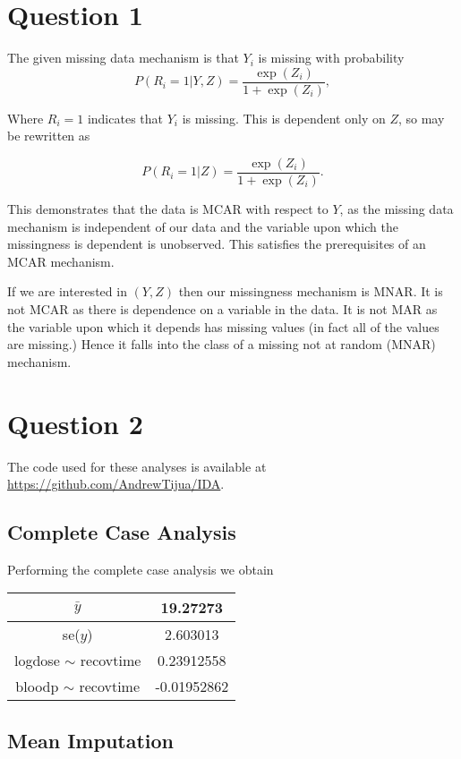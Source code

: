 \documentclass[11pt]{article}
\begin{document}
	
\section{Question 1}

The given missing data mechanism is that $Y_i$ is missing with probability $$P(R_i = 1|Y,Z) = \frac{\exp(Z_i)}{1+\exp(Z_i)},$$

Where $R_i = 1$ indicates that $Y_i$ is missing. This is dependent only on $Z$, so may be rewritten as 

$$P(R_i = 1|Z) = \frac{\exp(Z_i)}{1+\exp(Z_i)}.$$

This demonstrates that the data is MCAR with respect to $Y$, as the missing data mechanism is independent of our data and the variable upon which the missingness is dependent is unobserved. This satisfies the prerequisites of an MCAR mechanism.

If we are interested in $(Y,Z)$ then our missingness mechanism is MNAR. It is not MCAR as there is dependence on a variable in the data. It is not MAR as the variable upon which it depends has missing values (in fact all of the values are missing.) Hence it falls into the class of a missing not at random (MNAR) mechanism.

\section{Question 2}

The code used for these analyses is available at \url{https://github.com/AndrewTijua/IDA}.

\subsection*{Complete Case Analysis}

Performing the complete case analysis we obtain 

\begin{table}[H]
\centering
\begin{tabular}{|c|c|}
	\hline 
	$\bar{y}$ & 19.27273\\ 
	\hline 
	se($y$) & 2.603013\\ 
	\hline 
	logdose $\sim$ recovtime & 0.23912558\\ 
	\hline 
	bloodp $\sim$ recovtime & -0.01952862\\ 
	\hline 
\end{tabular} 
\end{table}

\subsection*{Mean Imputation}
\end{document}

